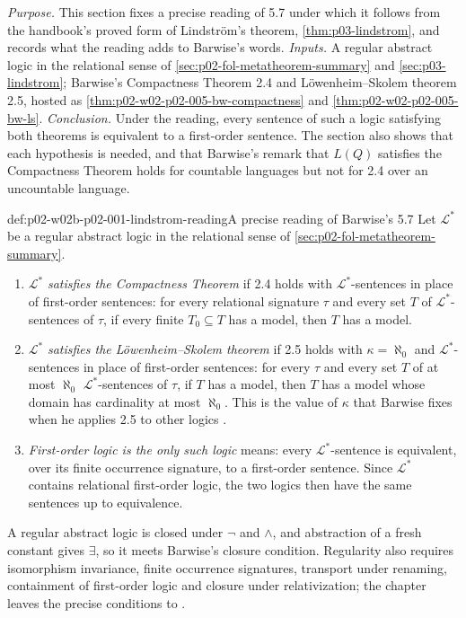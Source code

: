 \emph{Purpose.}  This section fixes a precise reading of 5.7 under which
it follows from the handbook's proved form of Lindstr\"om's theorem,
\cref{thm:p03-lindstrom}, and records what the reading adds to Barwise's
words.  \emph{Inputs.}  A regular abstract logic in the relational sense
of \cref{sec:p02-fol-metatheorem-summary} and \cref{sec:p03-lindstrom};
Barwise's Compactness Theorem 2.4 and L\"owenheim--Skolem theorem 2.5,
hosted as \cref{thm:p02-w02-p02-005-bw-compactness} and
\cref{thm:p02-w02-p02-005-bw-ls}.  \emph{Conclusion.}  Under the reading,
every sentence of such a logic satisfying both theorems is equivalent to a
first-order sentence.  The section also shows that each hypothesis is
needed, and that Barwise's remark that \(L(Q)\) satisfies the Compactness
Theorem holds for countable languages but not for 2.4 over an uncountable
language.

\begin{hbconvention}{def:p02-w02b-p02-001-lindstrom-reading}{A precise reading of Barwise's 5.7}
Let \(\mathcal L^{\ast}\) be a regular abstract logic in the relational
sense of \cref{sec:p02-fol-metatheorem-summary}.
\begin{enumerate}
\item \(\mathcal L^{\ast}\) \emph{satisfies the Compactness Theorem} if
      2.4 holds with \(\mathcal L^{\ast}\)-sentences in place of
      first-order sentences: for every relational signature \(\tau\) and
      every set \(T\) of \(\mathcal L^{\ast}\)-sentences of \(\tau\), if
      every finite \(T_0\subseteq T\) has a model, then \(T\) has a model.
\item \(\mathcal L^{\ast}\) \emph{satisfies the L\"owenheim--Skolem
      theorem} if 2.5 holds with \(\kappa=\aleph_0\) and
      \(\mathcal L^{\ast}\)-sentences in place of first-order sentences:
      for every \(\tau\) and every set \(T\) of at most \(\aleph_0\)
      \(\mathcal L^{\ast}\)-sentences of \(\tau\), if \(T\) has a model,
      then \(T\) has a model whose domain has cardinality at most
      \(\aleph_0\).  This is the value of \(\kappa\) that Barwise fixes when
      he applies 2.5 to other logics
      \cite[ch.~A.1, \S5, 5.6, p.~45]{Barwise1977FirstOrder}.
\item \emph{First-order logic is the only such logic} means: every
      \(\mathcal L^{\ast}\)-sentence is equivalent, over its finite
      occurrence signature, to a first-order sentence.  Since
      \(\mathcal L^{\ast}\) contains relational first-order logic, the two
      logics then have the same sentences up to equivalence.
\end{enumerate}
A regular abstract logic is closed under \(\neg\) and \(\land\), and
abstraction of a fresh constant gives \(\exists\), so it meets Barwise's
closure condition.  Regularity also requires isomorphism invariance, finite
occurrence signatures, transport under renaming, containment of
first-order logic and closure under relativization; the chapter leaves the
precise conditions to \cite{Barwise1974Axioms}.
\end{hbconvention}

